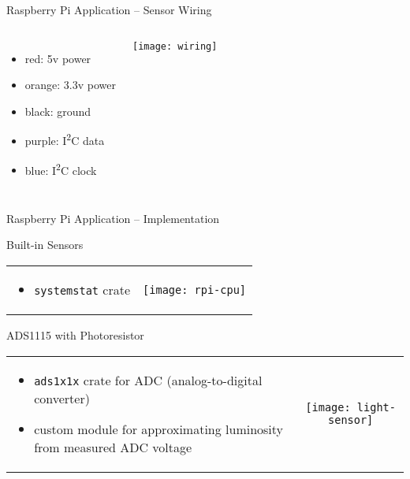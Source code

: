 \begin{frame}{Raspberry Pi Application -- Sensor Wiring}
  \begin{columns}

    \begin{itemize}
      \item {\color{red}red:} 5v power
      \item {\color{orange}orange:} 3.3v power
      \item {\color{black}black:} ground
      \item {\color{purple}purple:} I\textsuperscript{2}C data
      \item {\color{blue}blue:} I\textsuperscript{2}C clock
    \end{itemize}

    \vspace*{1em}
    \texttt{[image: wiring]}
  \end{columns}
\end{frame}

\begin{frame}{Raspberry Pi Application -- Implementation}
  \begin{block}{Built-in Sensors}
    \begin{tabularx}{\textwidth}{XC}
      \begin{itemize}
        \item \texttt{systemstat} crate
      \end{itemize}
      &
      \texttt{[image: rpi-cpu]}
    \end{tabularx}
  \end{block}

  \begin{block}{ADS1115 with Photoresistor}
    \begin{tabularx}{\textwidth}{XC}
      \begin{itemize}
        \item \texttt{ads1x1x} crate for ADC (analog-to-digital converter)
        \item custom module for approximating luminosity from measured ADC voltage
      \end{itemize}
      &
      \texttt{[image: light-sensor]}
    \end{tabularx}
  \end{block}
\end{frame}

